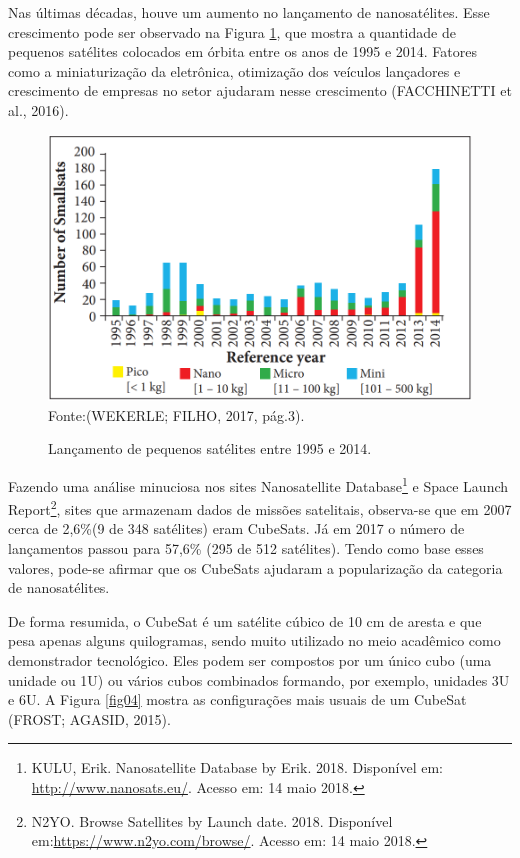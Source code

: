 Nas últimas décadas, houve um aumento no lançamento de nanosatélites. Esse crescimento pode ser observado na Figura \ref{fig03}, que mostra a quantidade de pequenos satélites colocados em órbita entre os anos de 1995 e 2014. Fatores como a miniaturização da eletrônica, otimização dos veículos lançadores e crescimento de empresas no setor ajudaram nesse crescimento (FACCHINETTI et al., 2016).

{\small
\begin{figure}[h]
	\centering
	\caption{Lançamento de pequenos satélites entre 1995 e 2014.}
	\includegraphics[keepaspectratio=true,scale=0.55]{figuras/lancamentoPequenoSatellite.PNG}
	Fonte:(WEKERLE; FILHO, 2017, pág.3).
	\label{fig03}
\end{figure}
}

Fazendo uma análise minuciosa nos sites Nanosatellite Database\footnote{ KULU, Erik. Nanosatellite Database by Erik. 2018. Disponível em: \url{http://www.nanosats.eu/}. Acesso em: 14 maio 2018.} e Space Launch Report\footnote{N2YO. Browse Satellites by Launch date. 2018. Disponível em:\url{https://www.n2yo.com/browse/}.  Acesso em: 14 maio 2018.}, sites que armazenam dados de missões satelitais, observa-se que em 2007 cerca de 2,6\%(9 de 348 satélites) eram CubeSats. Já em 2017 o número de lançamentos passou para 57,6\% (295 de 512 satélites). Tendo como base esses valores, pode-se afirmar que os CubeSats ajudaram a popularização da categoria de nanosatélites.

De forma resumida, o CubeSat é um satélite cúbico de 10 cm de aresta e que pesa apenas alguns quilogramas, sendo muito utilizado no meio acadêmico como demonstrador tecnológico. Eles podem ser compostos por um único cubo (uma unidade ou 1U) ou vários cubos combinados formando, por exemplo, unidades 3U e 6U. A Figura \ref{fig04} mostra as configurações mais usuais de um CubeSat (FROST; AGASID, 2015).

